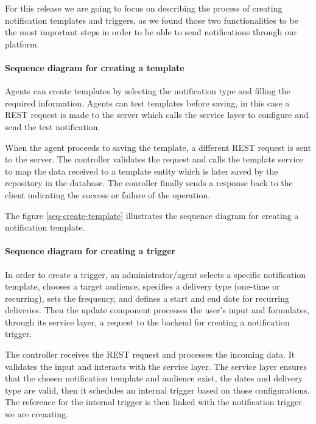 For this release we are going to focus on describing the process of creating notification templates
and triggers, as we found those two functionalities to be the most important steps in
order to be able to send notifications through our platform.

\paragraph{Sequence diagram for creating a template} \mbox{} \newline \newline
Agents can create templates by selecting the notification type and filling the required information. Agents
can test templates before saving, in this case a REST request is made to the server which calls the service
layer to configure and send the test notification.

When the agent proceeds to saving the template, a different REST request is sent to the server.
The controller validates the request and calls the template service to map the data received to a template
entity which is later saved by the repository in the database. The conroller finally sends a response back
to the client indicating the success or failure of the operation.

\noindent The figure \ref{seq-create-template} illustrates the sequence diagram for creating a notification template.

\paragraph{Sequence diagram for creating a trigger} \mbox{} \newline \newline
In order to create a trigger, an administrator/agent selects a specific notification template, chooses a target
audience, specifies a delivery type (one-time or recurring), sets the frequency, and defines a start and end
date for recurring deliveries. Then the update component processes the user's input and formulates, through
its service layer, a request to the backend for creating a notification trigger.

The controller receives the REST request and processes the incoming data. It validates the input
and interacts with the service layer. The service layer ensures that the chosen notification template and
audience exist, the dates and delivery type are valid, then it schedules an internal trigger based on those
configurations. The reference for the internal trigger is then linked with the notification trigger we are
creaating.

